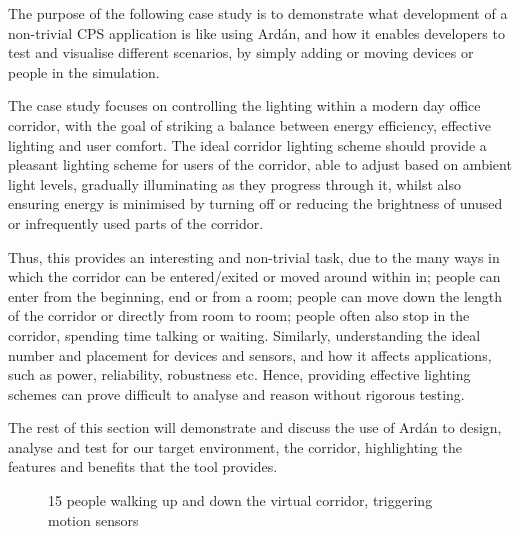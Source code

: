The purpose of the following case study is to demonstrate what development of a non-trivial CPS application is like using Ard\'{a}n, and how it enables developers to test and visualise different scenarios, by simply adding or moving devices or people in the simulation.

The case study focuses on controlling the lighting within a modern day office corridor, with the goal of striking a balance between energy efficiency, effective lighting and user comfort. The ideal corridor lighting scheme should provide a pleasant lighting scheme for users of the corridor, able to adjust based on ambient light levels, gradually illuminating as they progress through it, whilst also ensuring energy is minimised by turning off or reducing the brightness of unused or infrequently used parts of the corridor.

Thus, this provides an interesting and non-trivial task, due to the many ways in which the corridor can be entered/exited or moved around within in; people can enter from the beginning, end or from a room; people can move down the length of the corridor or directly from room to room; people often also stop in the corridor, spending time talking or waiting. Similarly, understanding the ideal number and placement for devices and sensors, and how it affects applications, such as power, reliability, robustness etc. Hence, providing effective lighting schemes can prove difficult to analyse and reason without rigorous testing.

The rest of this section will demonstrate and discuss the use of Ard\'{a}n to design, analyse and test for our target environment, the corridor, highlighting the features and benefits that the tool provides.


\begin{figure}[t]
  \centering
  \caption{15 people walking up and down the virtual corridor, triggering motion sensors}
  \label{fig:views}
\end{figure}


